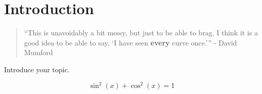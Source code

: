 \chapter{Introduction}

\begin{quote}
``This is unavoidably a bit messy, but just to be able to brag, I think it is a good idea to be able to say, `I have seen {\bfseries every} curve once.''' - David Mumford \cite{mumford}
\end{quote}

Introduce your topic. 

$$
\sin^2(x) +\cos^2(x)=1
$$
